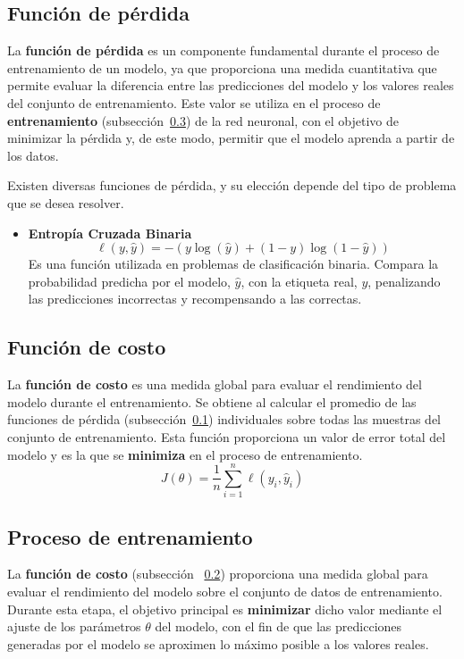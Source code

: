 
\subsection{Función de pérdida}
\label{subsec:FuncionPerdida}
La \textbf{función de pérdida} es un componente fundamental durante el proceso de entrenamiento de un modelo, ya que proporciona una medida cuantitativa que permite evaluar la diferencia entre las predicciones del modelo y los valores reales del conjunto de entrenamiento. Este valor se utiliza en el proceso de \textbf{entrenamiento} (subsección~\ref{subsec:Entrenamiento}) de la red neuronal, con el objetivo de minimizar la pérdida y, de este modo, permitir que el modelo aprenda a partir de los datos.

Existen diversas funciones de pérdida, y su elección depende del tipo de problema que se desea resolver.
\begin{itemize}
    \item \textbf{Entropía Cruzada Binaria}
        \[\ell(y, \hat{y}) = -(y \log(\hat{y}) + (1 - y) \log(1 - \hat{y}))\]
       Es una función utilizada en problemas de clasificación binaria. Compara la probabilidad predicha por el modelo, \(\hat{y}\), con la etiqueta real, \(y\), penalizando las predicciones incorrectas y recompensando a las correctas.
\end{itemize}

\subsection{Función de costo}
\label{subsec:FuncionCosto}
La \textbf{función de costo} es una medida global para evaluar el rendimiento del modelo durante el entrenamiento. Se obtiene al calcular el promedio de las funciones de pérdida (subsección~\ref{subsec:FuncionPerdida}) individuales sobre todas las muestras del conjunto de entrenamiento. Esta función proporciona un valor de error total del modelo y es la que se \textbf{minimiza} en el proceso de entrenamiento.
\[J(\theta) = \frac{1}{n} \sum_{i=1}^{n} \ell(y_i, \hat{y}_i)\]

\subsection{Proceso de entrenamiento}
\label{subsec:Entrenamiento}
La \textbf{función de costo} (subsección ~\ref{subsec:FuncionCosto}) proporciona una medida global para evaluar el rendimiento del modelo sobre el conjunto de datos de entrenamiento. Durante esta etapa, el objetivo principal es \textbf{minimizar} dicho valor mediante el ajuste de los parámetros \(\theta\) del modelo, con el fin de que las predicciones generadas por el modelo se aproximen lo máximo posible a los valores reales.

